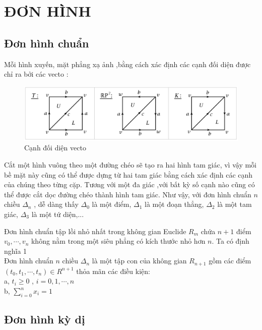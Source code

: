 \chapter{ĐƠN HÌNH}

\section{Đơn hình chuẩn}
\indent Mỗi hình xuyến, mặt phẳng xạ ảnh ,bằng cách xác định các cạnh đối diện được chỉ ra bởi các vecto :
\begin{figure}[h]  
\includegraphics[width=\textwidth]{figures/chap1_1}
\caption[Cạnh đối diện vecto]{Cạnh đối diện vecto
\label{fig:chap1_1}}
\end{figure}

\indent Cắt một hình vuông theo một đường chéo sẽ tạo ra hai hình tam giác, vì vậy mỗi bề mặt này cũng có thể được dựng từ hai tam giác bằng cách xác định các cạnh của chúng theo từng cặp. Tương với một đa giác ,với bất kỳ số cạnh nào cũng có thể được cắt dọc đường chéo thành  hình tam giác. Như vậy, với đơn hình chuẩn \(n\) chiều \(\Delta_n\) , dễ dàng thấy \(\Delta_0\) là một điểm, \(\Delta_1\) là một đoạn thẳng, \(\Delta_2\) là một tam giác, \(\Delta_3\) là một tứ diện,...

\indent Đơn hình chuẩn tập lồi nhỏ nhất trong không gian Euclide \(R_m\) chứa \(n + 1\) điểm  \(v_0,\cdots,v_n\) không nằm trong một siêu phẳng có kích thước nhỏ hơn \(n\).
\newpage
\indent Ta có định nghĩa 1 \\
\indent Đơn hình chuẩn \(n\) chiều \(\Delta_n\) là một tập con của không gian \(R_{n+1}\) gồm các điểm \((t_0, t_1,\cdots, t_n) \in R^{n+1}\) thỏa mãn các điều kiện: \\
\indent a, \(t_i \geq 0\) , \(i = 0,1,\cdots,n\) \\
\indent b, \(\sum_{i=0}^{n}x_i=1\)

\section{Đơn hình kỳ dị}
